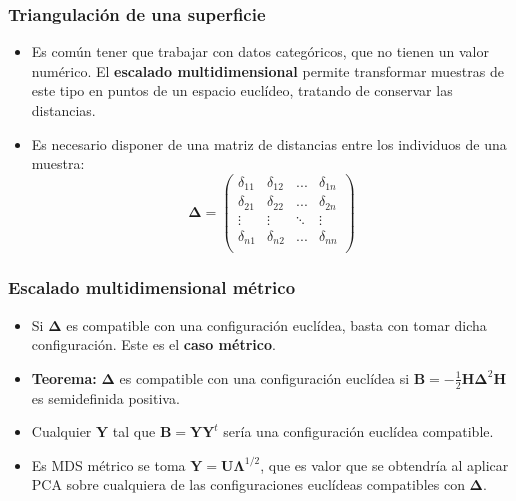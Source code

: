 \documentclass{beamer}
\begin{document}
\begin{frame}
\frametitle{Triangulación de una superficie}

\begin{itemize}
    \item Es común tener que trabajar con datos categóricos, que no tienen un valor numérico. El \textbf{escalado multidimensional} permite transformar muestras de este tipo en puntos de un espacio euclídeo, tratando de conservar las distancias.
    \item Es necesario disponer de una matriz de distancias entre los individuos de una muestra:
    \begin{equation*}
    \boldsymbol{\Delta} = \begin{pmatrix}
    \delta_{11} & \delta_{12} & ... & \delta_{1n} \\
    \delta_{21} & \delta_{22} & ... & \delta_{2n} \\
    \vdots & \vdots & \ddots & \vdots \\
    \delta_{n1} & \delta_{n2} & ... & \delta_{nn} \\
    \end{pmatrix}
    \end{equation*}
\end{itemize}
\end{frame}

\begin{frame}
\frametitle{Escalado multidimensional métrico}

\begin{itemize}
    \item Si $\boldsymbol{\Delta}$ es compatible con una configuración euclídea, basta con tomar dicha configuración. Este es el \textbf{caso métrico}.
    \item \textbf{Teorema:} $\boldsymbol{\Delta}$ es compatible con una configuración euclídea si $\boldsymbol{B} =  -\frac{1}{2} \boldsymbol{H} \boldsymbol{\Delta}^2  \boldsymbol{H}$ es semidefinida positiva.
    \item Cualquier $\boldsymbol{Y}$ tal que
    $\boldsymbol{B} = \boldsymbol{Y}\boldsymbol{Y}^t$ sería una configuración euclídea compatible.
    \item Es MDS métrico se toma $\boldsymbol{Y} = \boldsymbol{U} \boldsymbol{\Lambda}^{1/2}$, que es valor que se obtendría al aplicar PCA sobre cualquiera de las configuraciones euclídeas compatibles con $\boldsymbol{\Delta}$. 
\end{itemize}


\end{frame}
\end{document}
